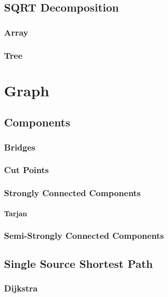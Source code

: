 \documentclass[10pt,a4paper]{report}
\begin{document}
	\section{SQRT Decomposition}
		\subsection{Array}
			
		\newpage
		\subsection{Tree}
			
	
\chapter{Graph}
	\section{Components}
		\subsection{Bridges}
			
		\newpage
		\subsection{Cut Points}
			
		\newpage
		\subsection{Strongly Connected Components}
			\subsubsection{Tarjan}
				
		\subsection{Semi-Strongly Connected Components}
	\section{Single Source Shortest Path}
		\subsection{Dijkstra}
		\newpage
\end{document}
